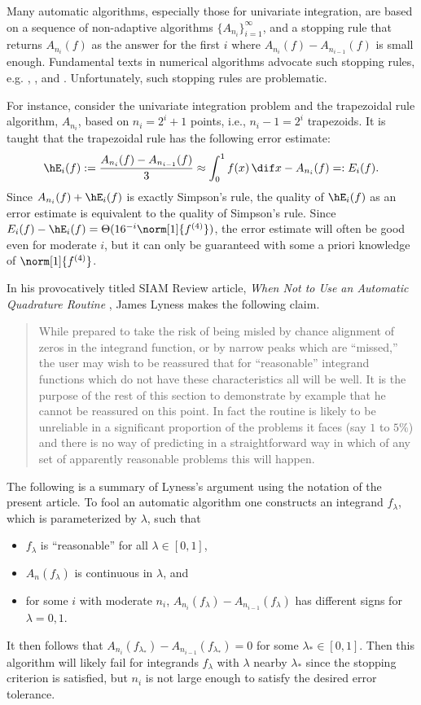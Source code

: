 \documentclass[]{elsarticle}
\theoremstyle{definition}
\theoremstyle{remark}
\begin{document}
Many automatic algorithms, especially those for univariate integration, are based on a sequence of non-adaptive algorithms $\{A_{n_i}\}_{i=1}^{\infty}$, and a stopping rule that returns $A_{n_{i}}(f)$ as the answer for the first $i$ where $A_{n_{i}}(f)-A_{n_{i-1}}(f)$ is small enough.  Fundamental texts in numerical algorithms advocate such stopping rules, e.g. \cite[p.\ 223--224]{BurFai10}, \cite[p.\ 233]{CheKin12a}, and \cite[p.\ 270]{Sau12a}.  Unfortunately, such stopping rules are problematic.

For instance, consider the univariate integration problem and the trapezoidal rule algorithm, $A_{n_i}$, based on $n_i=2^i+1$ points, i.e., $n_i-1=2^i$ trapezoids.  It is taught that the trapezoidal rule has the following error estimate:
\[
\hE_i(f):=\frac{A_{n_{i}}(f)-A_{n_{i-1}}(f)}{3} \approx \int_0^1 f(x) \, \dif x - A_{n_i}(f) =:E_i(f).
\]
Since $A_{n_i}(f)+ \hE_i(f)$ is exactly Simpson's rule, the quality of $\hE_i(f)$ as an error estimate is equivalent to the quality of Simpson's rule. Since $E_i(f) -\hE_i(f) = \Theta(16^{-i} \norm[1]{f^{(4)}})$, the error estimate will often be good even for moderate $i$, but it can only be guaranteed with some a priori knowledge of $\norm[1]{f^{(4)}}$.

In his provocatively titled SIAM Review article, \emph{When Not to Use an Automatic Quadrature Routine} \cite[p.\ 69]{Lyn83}, James Lyness makes the following claim.
\begin{quote}
While prepared to take the risk of being misled by chance alignment of zeros in the integrand function, or by narrow peaks which are ``missed,'' the user may wish to be reassured that for ``reasonable'' integrand functions which do not have these characteristics all will be well. It is the purpose of the rest of this section to demonstrate by example that he cannot be reassured on this point. In fact the routine is likely to be unreliable in a significant proportion of the problems it faces (say $1$ to $5\%$) and there is no way of predicting in a straightforward way in which of any set of apparently reasonable problems this will happen.
\end{quote}

The following is a summary of Lyness's argument using the notation of the present article. To fool an automatic algorithm one constructs an integrand $f_\lambda$, which is parameterized by $\lambda$, such that 
\begin{itemize}
\item $f_\lambda$ is ``reasonable'' for all $\lambda \in [0,1]$,
\item $A_n(f_\lambda)$ is continuous in $\lambda$, and 
\item for some $i$ with moderate $n_i$, $A_{n_{i}}(f_\lambda)-A_{n_{i-1}}(f_\lambda)$ has different signs for $\lambda=0,1$.  
\end{itemize}
It then follows that $A_{n_{i}}(f_{\lambda_*})-A_{n_{i-1}}(f_{\lambda_*})=0$ for some $\lambda_* \in [0,1]$.  Then this algorithm will likely fail for integrands $f_{\lambda}$ with $\lambda$ nearby $\lambda_*$ since the stopping criterion is satisfied, but $n_i$ is not large enough to satisfy the desired error tolerance.
\end{document}
